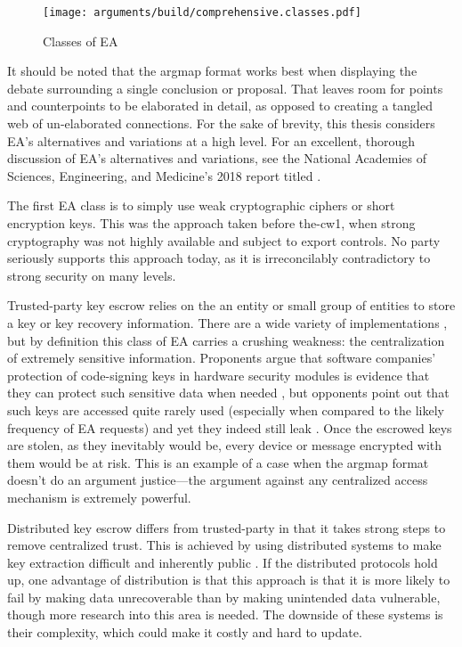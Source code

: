 \begin{sidewaysfigure}[p!]
  \centering\CaptionFontSize
  \texttt{[image: arguments/build/comprehensive.classes.pdf]}
  \caption{Classes of EA}
  \label{fig-arg-classes}
\end{sidewaysfigure}

It should be noted that the \ac{argmap} format works best when displaying the debate surrounding a single conclusion or
proposal. That leaves room for points and counterpoints to be elaborated in detail, as opposed to creating a tangled web
of un-elaborated connections. For the sake of brevity, this thesis considers \ac{EA}'s alternatives and variations at a
high level. For an excellent, thorough discussion of \ac{EA}'s alternatives and variations, see the National Academies
of Sciences, Engineering, and Medicine's 2018 report titled  \cite{committee_decrypting_2018}.

The first \ac{EA} class is to simply use weak cryptographic ciphers or short encryption keys. This was the approach
taken before \ac{the-cw1}, when strong cryptography was not highly available and subject to export controls. No party
seriously supports this approach today, as it is irreconcilably contradictory to strong security on many levels.

Trusted-party key escrow relies on the an entity or small group of entities to store a key or key recovery information.
There are a wide variety of implementations \cite{denning_taxonomy_1996}, but by definition this class of \ac{EA}
carries a crushing weakness: the centralization of extremely sensitive information. Proponents argue that software
companies' protection of code-signing keys in hardware security modules is evidence that they can protect such sensitive
data when needed \cite{ozzie_2018}, but opponents point out that such keys are accessed quite rarely used (especially
when compared to the likely frequency of \ac{EA} requests) and yet they indeed still leak \cite{green_2018}. Once the
escrowed keys are stolen, as they inevitably would be, every device or message encrypted with them would be at risk.
This is an example of a case when the \ac{argmap} format doesn't do an argument justice---the argument against any
centralized access mechanism is extremely powerful.

Distributed key escrow differs from trusted-party in that it takes strong steps to remove centralized trust. This is
achieved by using distributed systems to make key extraction difficult and inherently public \cite{phan_key_2017}
\cite{servan_schreiber_jje_2020}. If the distributed protocols hold up, one advantage of distribution is that this
approach is that it is more likely to fail by making data unrecoverable than by making unintended data vulnerable,
though more research into this area is needed. The downside of these systems is their complexity, which could make it
costly and hard to update.

